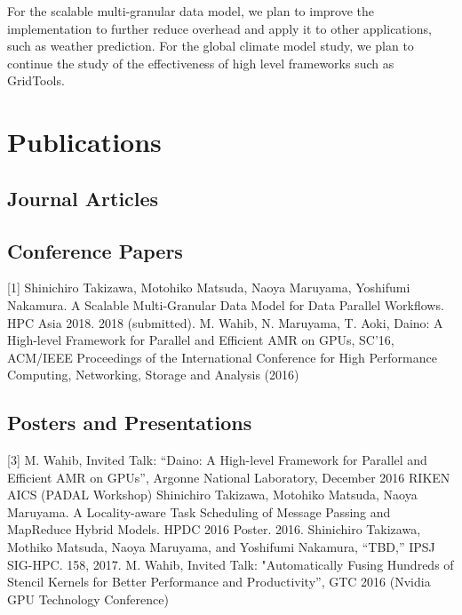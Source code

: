 \documentclass{book}
\begin{document}
For the scalable multi-granular data model, we plan to improve the implementation to further reduce overhead and apply it to other applications, such as weather prediction. For the global climate model study, we plan to continue the study of the effectiveness of high level frameworks such as GridTools.


\section{Publications}

\subsection{Journal Articles}

\subsection{Conference Papers}

[1] Shinichiro Takizawa, Motohiko Matsuda, Naoya Maruyama, Yoshifumi Nakamura. A Scalable Multi-Granular Data Model for Data Parallel Workflows. HPC Asia 2018. 2018 (submitted). \newline
[2] M. Wahib, N. Maruyama, T. Aoki, Daino: A High-level Framework for Parallel and Efficient AMR on GPUs, SC'16, ACM/IEEE Proceedings of the International Conference for High Performance Computing, Networking, Storage and Analysis (2016) \newline

\subsection{Posters and Presentations}
[3] M. Wahib, Invited Talk: “Daino: A High-level Framework for Parallel and Efficient AMR on GPUs”, Argonne National Laboratory, December 2016
RIKEN AICS (PADAL Workshop) \newline
[4] Shinichiro Takizawa, Motohiko Matsuda, Naoya Maruyama. A Locality-aware Task Scheduling of Message Passing and MapReduce Hybrid Models. HPDC 2016 Poster. 2016. \newline
[5] Shinichiro Takizawa, Mothiko Matsuda, Naoya Maruyama, and Yoshifumi Nakamura, “TBD,” IPSJ SIG-HPC. 158, 2017. \newline
[6] M. Wahib, Invited Talk: "Automatically Fusing Hundreds of Stencil Kernels for Better Performance and Productivity”, GTC 2016 (Nvidia GPU Technology Conference) \newline
\end{document}
